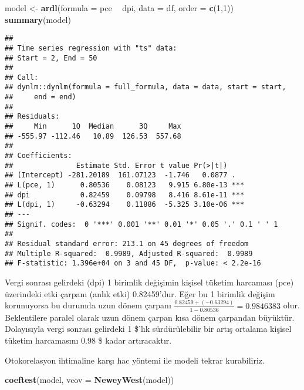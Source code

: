 \documentclass[
]{book}
\newenvironment{Shaded}{\begin{snugshade}}{\end{snugshade}}
\newcommand{\DataTypeTok}[1]{\textcolor[rgb]{0.13,0.29,0.53}{#1}}
\newcommand{\DecValTok}[1]{\textcolor[rgb]{0.00,0.00,0.81}{#1}}
\newcommand{\KeywordTok}[1]{\textcolor[rgb]{0.13,0.29,0.53}{\textbf{#1}}}
\newcommand{\NormalTok}[1]{#1}
\newcommand{\OperatorTok}[1]{\textcolor[rgb]{0.81,0.36,0.00}{\textbf{#1}}}
\newcommand{\StringTok}[1]{\textcolor[rgb]{0.31,0.60,0.02}{#1}}
\begin{document}
\begin{Shaded}
\begin{Highlighting}[]
\NormalTok{model <-}\StringTok{ }\KeywordTok{ardl}\NormalTok{(}\DataTypeTok{formula =}\NormalTok{ pce }\OperatorTok{~}\StringTok{ }\NormalTok{dpi, }\DataTypeTok{data =}\NormalTok{ df, }\DataTypeTok{order =} \KeywordTok{c}\NormalTok{(}\DecValTok{1}\NormalTok{,}\DecValTok{1}\NormalTok{))}
\KeywordTok{summary}\NormalTok{(model)}
\end{Highlighting}
\end{Shaded}

\begin{verbatim}
## 
## Time series regression with "ts" data:
## Start = 2, End = 50
## 
## Call:
## dynlm::dynlm(formula = full_formula, data = data, start = start, 
##     end = end)
## 
## Residuals:
##     Min      1Q  Median      3Q     Max 
## -555.97 -112.46   10.89  126.53  557.68 
## 
## Coefficients:
##               Estimate Std. Error t value Pr(>|t|)    
## (Intercept) -281.20189  161.07123  -1.746   0.0877 .  
## L(pce, 1)      0.80536    0.08123   9.915 6.80e-13 ***
## dpi            0.82459    0.09798   8.416 8.61e-11 ***
## L(dpi, 1)     -0.63294    0.11886  -5.325 3.10e-06 ***
## ---
## Signif. codes:  0 '***' 0.001 '**' 0.01 '*' 0.05 '.' 0.1 ' ' 1
## 
## Residual standard error: 213.1 on 45 degrees of freedom
## Multiple R-squared:  0.9989, Adjusted R-squared:  0.9989 
## F-statistic: 1.396e+04 on 3 and 45 DF,  p-value: < 2.2e-16
\end{verbatim}

Vergi sonrası gelirdeki (dpi) 1 birimlik değişimin kişisel tüketim harcaması (pce) üzerindeki etki çarpanı (anlık etki) 0.82459'dur. Eğer bu 1 birimlik değişim korunuyorsa bu durumda uzun dönem çarpanı \(\frac{0.82459 + (-0.63294)}{1 - 0.80536} = 0.9846383\) olur. Beklentilere paralel olarak uzun dönem çarpan kısa dönem çarpandan büyüktür. Dolayısıyla vergi sonrası gelirdeki 1 \$'lık sürdürülebilir bir artış ortalama kişisel tüketim harcamasını 0.98 \$ kadar artıracaktır.

Otokorelasyon ihtimaline karşı hac yöntemi ile modeli tekrar kurabiliriz.

\begin{Shaded}
\begin{Highlighting}[]
\KeywordTok{coeftest}\NormalTok{(model, }\DataTypeTok{vcov =} \KeywordTok{NeweyWest}\NormalTok{(model))}
\end{Highlighting}
\end{Shaded}
\end{document}
